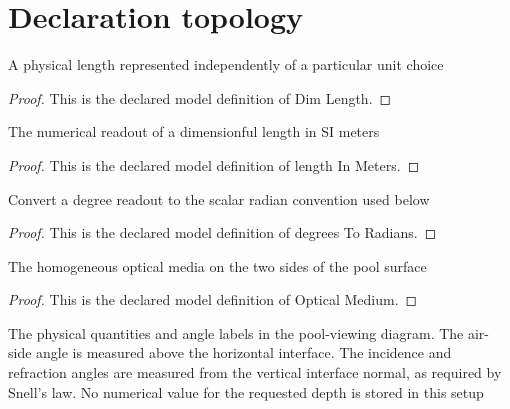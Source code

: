 \section{Declaration topology}
\begin{definition}
  \label{def:physics:phyx-mini-0145:phyxminiproblems-problemphyxmini0145-dimlength}
  A physical length represented independently of a particular unit choice
\end{definition}
\begin{proof}
  This is the declared model definition of Dim Length.
\end{proof}
\begin{definition}
  \label{def:physics:phyx-mini-0145:phyxminiproblems-problemphyxmini0145-lengthinmeters}
  The numerical readout of a dimensionful length in SI meters
\end{definition}
\begin{proof}
  This is the declared model definition of length In Meters.
\end{proof}
\begin{definition}
  \label{def:physics:phyx-mini-0145:phyxminiproblems-problemphyxmini0145-degreestoradians}
  Convert a degree readout to the scalar radian convention used below
\end{definition}
\begin{proof}
  This is the declared model definition of degrees To Radians.
\end{proof}
\begin{definition}
  \label{def:physics:phyx-mini-0145:phyxminiproblems-problemphyxmini0145-opticalmedium}
  The homogeneous optical media on the two sides of the pool surface
\end{definition}
\begin{proof}
  This is the declared model definition of Optical Medium.
\end{proof}
\begin{definition}
  \label{def:physics:phyx-mini-0145:phyxminiproblems-problemphyxmini0145-poolviewingsetup}
  The physical quantities and angle labels in the pool-viewing diagram. The air-side angle is measured above the horizontal interface. The incidence and refraction angles are measured from the vertical interface normal, as required by Snell's law. No numerical value for the requested depth is stored in this setup
\end{definition}
